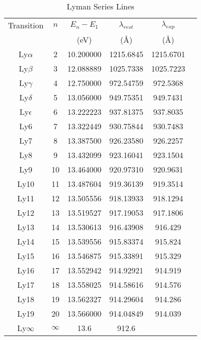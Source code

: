 \documentclass[graybox]{svmult}
\begin{document}
\begin{table}[ht]
\begin{center}
\caption{Lyman Series Lines \label{tab:energies}}
\begin{tabular}{cccccc}
\hline
Transition & $n$ & $E_n - E_1$ & $\lambda_{rest}$ & $\lambda_{exp}$ \\
& & (eV) & (\AA) & (\AA) \\
\hline
Ly$\alpha$&           2&       10.200000&       1215.6845& 1215.6701 \\
Ly$\beta$&            3&       12.088889&       1025.7338& 1025.7223\\
Ly$\gamma$&           4&       12.750000&       972.54759&  972.5368\\
Ly$\delta$&           5&       13.056000&       949.75351&  949.7431\\
Ly$\epsilon$&         6&       13.222223&       937.81375&  937.8035\\
Ly6&                  7&       13.322449&       930.75844&  930.7483\\
Ly7&                  8&       13.387500&       926.23580&  926.2257\\
Ly8&                  9&       13.432099&       923.16041&  923.1504\\
Ly9&                  10&       13.464000&       920.97310& 920.9631\\
Ly10&                 11&       13.487604&       919.36139& 919.3514\\
Ly11&                 12&       13.505556&       918.13933& 918.1294\\
Ly12&                 13&       13.519527&       917.19053& 917.1806\\
Ly13&                 14&       13.530613&       916.43908& 916.429\\
Ly14&                 15&       13.539556&       915.83374& 915.824\\
Ly15&                 16&       13.546875&       915.33891& 915.329\\
Ly16&                 17&       13.552942&       914.92921& 914.919\\
Ly17&                 18&       13.558025&       914.58616& 914.576\\
Ly18&                 19&       13.562327&       914.29604& 914.286\\
Ly19&                 20&       13.566000&       914.04849& 914.039\\
Ly$\infty$&         $\infty$&   13.6&            912.6    & \\
\hline
\end{tabular}
\end{center}
\end{table}
\end{document}
